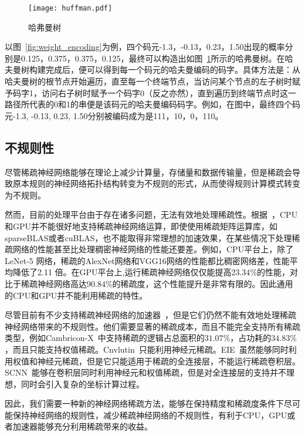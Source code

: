 \begin{figure}[h]
\centering
\texttt{[image: huffman.pdf]}
\caption{哈弗曼树}
\label{fig:huffman}
\end{figure}
以图~\ref{fig:weight_encoding}为例，四个码元-1.3，-0.13，0.23，1.50出现的概率分别是0.125，0.375，0.375，0.125，最终可以构造出如图~\ref{fig:huffman}所示的哈弗曼树。在哈夫曼树构建完成后，便可以得到每一个码元的哈夫曼编码的码字。具体方法是：从哈夫曼树的根节点开始遍历，直至每一个终端节点，当访问某个节点的左子树时赋予码字1，访问右子树时赋予一个码字0（反之亦然），直到遍历到终端节点时这一路径所代表的0和1的串便是该码元的哈夫曼编码码字。例如，在图中，最终四个码元-1.3, -0.13, 0.23, 1.50分别被编码成为是111，10，0，110。

\subsection{不规则性}
尽管稀疏神经网络能够在理论上减少计算量，存储量和数据传输量，但是稀疏会导致原本规则的神经网络拓扑结构转变为不规则的形式，从而使得规则计算模式转变为不规则。

然而，目前的处理平台由于存在诸多问题，无法有效地处理稀疏性。根据~\cite{zhang2016cambricon}，CPU和GPU并不能很好地支持稀疏神经网络运算，即使使用稀疏矩阵运算库，如sparseBLAS或者cuBLAS，也不能取得非常理想的加速效果，在某些情况下处理稀疏网络的性能甚至比处理稠密神经网络的性能还要差。例如，CPU平台上，除了 LeNet-5 网络，稀疏的AlexNet网络和VGG16网络的性能都比稠密网络差，性能平均降低了2.11 倍。在GPU平台上,运行稀疏神经网络仅仅能提高$23.34\%$的性能，对比于稀疏神经网络高达$90.84\%$的稀疏度，这个性能提升是非常有限的。因此通用的CPU和GPU并不能利用稀疏的特性。

尽管目前有不少支持稀疏神经网络的加速器~\cite{zhang2016cambricon, albericio2016cnvlutin, han2016eie, han2017ese, angshuman2017scnn}，但是它们仍然不能有效地处理稀疏神经网络带来的不规则性。他们需要显著的稀疏成本，而且不能完全支持所有稀疏类型，例如Cambricon-X~\cite{zhang2016cambricon}中支持稀疏的逻辑占总面积的$31.07\%$，占功耗的$34.83\%$，而且只能支持权值稀疏。Cnvlutin~\cite{albericio2016cnvlutin}只能利用神经元稀疏。EIE~\cite{han2016eie}虽然能够同时利用权值和神经元稀疏，但是它只能适用于稀疏的全连接层，不能运行稀疏卷积层。SCNN~\cite{angshuman2017scnn}能够在卷积层同时利用神经元和权值稀疏，但是对全连接层的支持并不理想，同时会引入复杂的坐标计算过程。

因此，我们需要一种新的神经网络稀疏方法，能够在保持精度和稀疏度条件下尽可能保持神经网络的规则性，减少稀疏神经网络的不规则性，有利于CPU，GPU或者加速器能够充分利用稀疏带来的收益。


